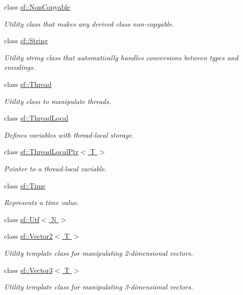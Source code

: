 \begin{DoxyCompactItemize}
class \hyperlink{classsf_1_1_non_copyable}{sf\+::\+Non\+Copyable}
\begin{DoxyCompactList}\small\item\em Utility class that makes any derived class non-\/copyable. \end{DoxyCompactList}\item 
class \hyperlink{classsf_1_1_string}{sf\+::\+String}
\begin{DoxyCompactList}\small\item\em Utility string class that automatically handles conversions between types and encodings. \end{DoxyCompactList}\item 
class \hyperlink{classsf_1_1_thread}{sf\+::\+Thread}
\begin{DoxyCompactList}\small\item\em Utility class to manipulate threads. \end{DoxyCompactList}\item 
class \hyperlink{classsf_1_1_thread_local}{sf\+::\+Thread\+Local}
\begin{DoxyCompactList}\small\item\em Defines variables with thread-\/local storage. \end{DoxyCompactList}\item 
class \hyperlink{classsf_1_1_thread_local_ptr}{sf\+::\+Thread\+Local\+Ptr$<$ T $>$}
\begin{DoxyCompactList}\small\item\em Pointer to a thread-\/local variable. \end{DoxyCompactList}\item 
class \hyperlink{classsf_1_1_time}{sf\+::\+Time}
\begin{DoxyCompactList}\small\item\em Represents a time value. \end{DoxyCompactList}\item 
class \hyperlink{classsf_1_1_utf}{sf\+::\+Utf$<$ N $>$}
\item 
class \hyperlink{classsf_1_1_vector2}{sf\+::\+Vector2$<$ T $>$}
\begin{DoxyCompactList}\small\item\em Utility template class for manipulating 2-\/dimensional vectors. \end{DoxyCompactList}\item 
class \hyperlink{classsf_1_1_vector3}{sf\+::\+Vector3$<$ T $>$}
\begin{DoxyCompactList}\small\item\em Utility template class for manipulating 3-\/dimensional vectors. \end{DoxyCompactList}\end{DoxyCompactItemize}
